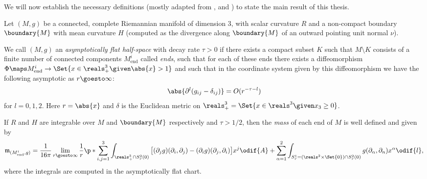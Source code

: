 \documentclass[titlepage,numbers=noenddot,headinclude,oneside,%
footinclude=true,cleardoublepage=empty,%
BCOR=5mm,paper=a4,fontsize=11pt,%
english,%
]{scrartcl}
\newcommand{\mass}[2]{\mathfrak{m}_{(#1,#2)}} %
\begin{document}
We will now establish the necessary definitions (mostly adapted from \cite{almarazPositiveMassTheorem2016}, \cite{eichmairDoublingAsymptoticallyFlat2023} and \cite{brayHarmonicFunctionsMass2019}) to state the main result of this thesis.
\begin{definition}
    Let \( (M,g) \) be a connected, complete Riemannian manifold of dimension 3, with scalar curvature \( R \) and a non-compact boundary \( \boundary{M} \) with mean curvature \( H \) (computed as the divergence along \( \boundary{M} \) of an outward pointing unit normal \( \nu \)).

    We call \((M,g) \) an \emph{asymptotically flat half-space} with decay rate \( \tau>0 \) if there exists a compact subset \( K \) such that \( M\setminus K \) consists of a finite number of connected components \(M_{\mathrm{end}}^i \) called \emph{ends}, such that for each of these ends there exists a diffeomorphism \( \Phi\maps M_{\mathrm{end}}^i \to \Set{x\in \reals^3_+\given \abs{x}>1} \) and such that in the coordinate system given by this diffeomorphism we have the following asymptotic as \( r\goesto \infty \):
    \begin{equation}
        \abs{\partial^l(g_{ij}-\delta_{ij})}=O(r^{-\tau-l})
    \end{equation}
    for \( l=0,1,2 \). Here \( r=\abs{x} \) and \( \delta \) is the Euclidean metric on \( \reals^3_+=\Set{x\in \reals^3\given x_3\geq 0} \). 
\end{definition}    
\begin{definition}\label{def:half_space_mass}
    If \( R \) and \( H \) are integrable over \( M \) and \( \boundary{M} \) respectively and \( \tau>1/2 \), then the \emph{mass} of each end of \( M \) is well defined and given by
    \begin{equation*}
        \mass{M_{\mathrm{end}}^i}{g}=\frac{1}{16\pi}\lim_{r \goesto \infty}\frac{1}{r}\p*{\sum_{i,j=1}^3\int_{\reals^3_+\cap S_r^{2}(0)}\big[(\partial_j g)(\partial_i,\partial_j)-(\partial_i g)(\partial_j,\partial_i)\big]x^j\odif{A}+\sum_{\alpha=1}^2\int_{S_r^{1}=(\reals^2\times \Set{0})\cap S_r^2(0)}g(\partial_\alpha,\partial_n)x^\alpha\odif{l}},
    \end{equation*}
    where the integrals are computed in the asymptotically flat chart.
\end{definition}
\end{document}
